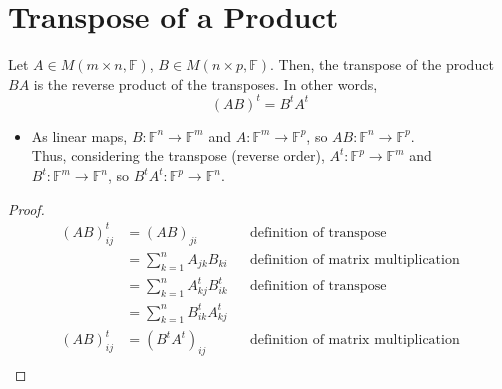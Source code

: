\documentclass[letterpaper,12pt]{article}
\begin{document}
\section*{Transpose of a Product}
\begin{theorem}
Let $A \in M(m \times n, \mathbb{F})$, $B \in M(n \times p, \mathbb{F})$. Then, the transpose of the product $BA$ is the reverse product of the transposes. In other words,
\begin{equation*}
    (AB)^t = B^t A^t
\end{equation*}
\begin{itemize}
    \item As linear maps, $B: \mathbb{F}^n \rightarrow \mathbb{F}^m$ and $A: \mathbb{F}^m \rightarrow \mathbb{F}^p$, so $AB: \mathbb{F}^n \rightarrow \mathbb{F}^p$.
    \\ Thus, considering the transpose (reverse order), $A^t: \mathbb{F}^p \rightarrow \mathbb{F}^m$ and $B^t: \mathbb{F}^m \rightarrow \mathbb{F}^n$, so $B^tA^t: \mathbb{F}^p \rightarrow \mathbb{F}^n$.
\end{itemize}
\end{theorem}
\begin{proof}
\begin{align*}
    (AB)^t_{ij} & = (AB)_{ji} && \text{definition of transpose} \\
    & = \sum_{k=1}^n A_{jk} B_{ki} && \text{definition of matrix multiplication} \\
    & = \sum_{k=1}^n A^t_{kj} B^t_{ik} && \text{definition of transpose} \\
    & = \sum_{k=1}^n B^t_{ik} A^t_{kj} \\
    (AB)^t_{ij} & = (B^t A^t)_{ij} && \text{definition of matrix multiplication} \\
\end{align*}
\end{proof}
\end{document}
